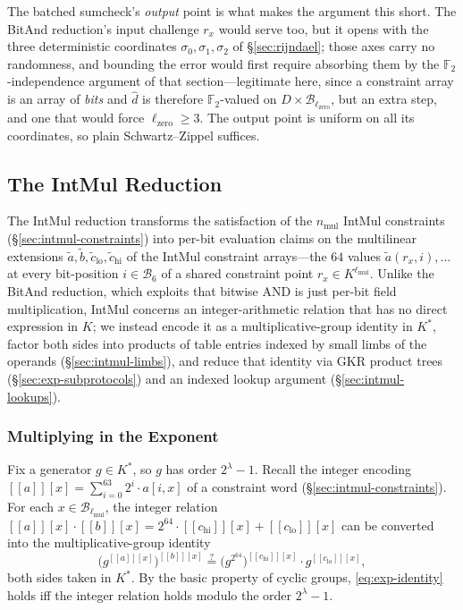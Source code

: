 \documentclass{article}
\theoremstyle{definition}
\newcommand*{\mle}{\widetilde}
\newcommand{\BB}{\mathcal{B}}
\newcommand{\FF}[1]{\mathbb{F}_{#1}}
\newcommand{\intval}[1]{[\![#1]\!]}
\begin{document}
The batched sumcheck's \emph{output} point is what makes the argument this short. The BitAnd reduction's input challenge $r_x$ would serve too, but it opens with the three deterministic coordinates $\sigma_0, \sigma_1, \sigma_2$ of \S\ref{sec:rijndael}; those axes carry no randomness, and bounding the error would first require absorbing them by the $\FF{2}$-independence argument of that section---legitimate here, since a constraint array is an array of \emph{bits} and $\widehat{d}$ is therefore $\FF{2}$-valued on $D \times \BB_{\ell_\text{zero}}$, but an extra step, and one that would force $\ell_\text{zero} \geq 3$. The output point is uniform on all its coordinates, so plain Schwartz--Zippel suffices.

\subsection{The IntMul Reduction}
\label{sec:intmul}

The IntMul reduction transforms the satisfaction of the $n_\text{mul}$ IntMul constraints (\S\ref{sec:intmul-constraints}) into per-bit evaluation claims on the multilinear extensions $\mle{a}, \mle{b}, \mle{c}_\text{lo}, \mle{c}_\text{hi}$ of the IntMul constraint arrays---the $64$ values $\mle{a}(r_x, i), \ldots$ at every bit-position $i \in \BB_6$ of a shared constraint point $r_x \in K^{\ell_\text{mul}}$. Unlike the BitAnd reduction, which exploits that bitwise AND is just per-bit field multiplication, IntMul concerns an integer-arithmetic relation that has no direct expression in $K$; we instead encode it as a multiplicative-group identity in $K^*$, factor both sides into products of table entries indexed by small limbs of the operands (\S\ref{sec:intmul-limbs}), and reduce that identity via GKR product trees (\S\ref{sec:exp-subprotocols}) and an indexed lookup argument (\S\ref{sec:intmul-lookups}).

\subsubsection{Multiplying in the Exponent}
\label{sec:multiplying-in-exponent}

Fix a generator $g \in K^*$, so $g$ has order $2^\lambda - 1$. Recall the integer encoding $\intval{a}[x] = \sum_{i = 0}^{63} 2^i \cdot a[i, x]$ of a constraint word (\S\ref{sec:intmul-constraints}). For each $x \in \BB_{\ell_\text{mul}}$, the integer relation $\intval{a}[x] \cdot \intval{b}[x] = 2^{64} \cdot \intval{c_\text{hi}}[x] + \intval{c_\text{lo}}[x]$ can be converted into the multiplicative-group identity
\begin{equation}
  \bigl( g^{\intval{a}[x]} \bigr)^{\intval{b}[x]} \stackrel{?}{=} \bigl( g^{2^{64}} \bigr)^{\intval{c_\text{hi}}[x]} \cdot g^{\intval{c_\text{lo}}[x]},
  \label{eq:exp-identity}
\end{equation}
both sides taken in $K^*$. By the basic property of cyclic groups, \eqref{eq:exp-identity} holds iff the integer relation holds modulo the order $2^\lambda - 1$.
\end{document}
